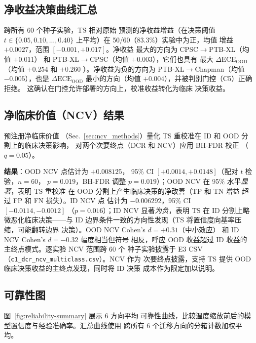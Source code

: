 \subsection{净收益决策曲线汇总}
\label{sec:net_benefit_summary}
跨所有 60 个种子实验，TS 相对原始
预测的净收益增益（在决策阈值 $t \in \{0.05, 0.10,
\ldots, 0.40\}$ 上平均）在 50/60（83.3\%）实验中为正，均值
增益 $+0.0027$，范围 $[-0.001, +0.017]$。净收益
最大的方向为 CPSC$\rightarrow$PTB-XL（均值 $+0.011$）
和 PTB-XL$\rightarrow$CPSC（均值 $+0.003$），它们也具有
最大 $\Delta\text{ECE}_{\text{OOD}}$（均值 $+0.254$ 和 $+0.260$
）。净收益为负的方向为
PTB-XL$\rightarrow$Chapman（均值 $-0.005$），也是
$\Delta\text{ECE}_{\text{OOD}}$ 最小的方向（均值
$+0.004$），并被判别门控（C5）正确拒绝。
这确认在门控允许部署的方向上，校准收益转化为临床
决策收益。

\subsection{净临床价值（NCV）结果}
\label{sec:ncv_results}
预注册净临床价值
（Sec.~\ref{sec:ncv_methods}）量化 TS 重校准在 ID 和 OOD 分割上的临床决策影响，
对两个次要终点（DCR 和 NCV）应用 BH-FDR 校正
（$q=0.05$）。

\textbf{结果}：OOD NCV 点估计为 $+0.008125$，
95\% CI $[+0.0014, +0.0148]$（配对 $t$ 检验，$n=60$，
$p=0.019$，BH-FDR 调整 $p=0.019$）；OOD NCV 在
95\% 水平\emph{显著}，表明 TS 重校准
在 OOD 分割上产生临床决策的净改善（TP 和 TN 增益
超过 FP 和 FN 损失）。ID NCV 点
估计为 $-0.006292$，95\% CI $[-0.0114, -0.0012]$
（$p=0.016$）；ID NCV 显著\emph{为负}，表明
TS 在 ID 分割上略微恶化临床决策——与
ID 边界条件一致的方向性发现（TS
将置信度向基率压缩，可能翻转边界
决策）。OOD NCV Cohen's $d = +0.31$（中小效应）
和 ID NCV Cohen's $d = -0.32$ 幅度相当但符号
相反，呼应 OOD 收益超过
ID 收益的主终点模式。逐实验 NCV 范围跨 60 个
种子实验披露于 E3 CSV
（\texttt{c1\_dcr\_ncv\_multiclass.csv}）。NCV 作为
次要终点披露，支持 TS
提供 OOD 临床决策收益的主终点发现，同时将 ID 决策
成本作为限定加以说明。

\subsection{可靠性图}
\label{sec:reliability-diagrams}
图~\ref{fig:reliability-summary} 展示 6 方向平均
可靠性曲线，比较温度缩放前后的模型置信度与经验准确率。汇总曲线使用
跨所有 6 个迁移方向的分箱计数加权平均。

